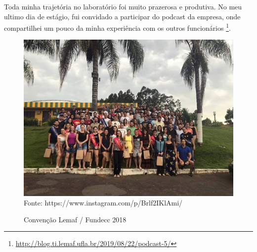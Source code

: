 Toda minha trajetória no laboratório foi muito prazerosa e produtiva. No meu ultimo dia de estágio, fui convidado a participar do podcast da empresa, onde compartilhei um pouco da minha experiência com os outros funcionários \footnote{\url{http://blog.ti.lemaf.ufla.br/2019/08/22/podcast-5/}}.

\begin{figure}[H]
\centering
\caption{Convenção Lemaf / Fundecc 2018} %
\includegraphics[scale=1]{convensao}\\  %
{\small Fonte: https://www.instagram.com/p/Brlf2IKlAmi/} %
\label{fig:exemplo} %
\end{figure}
    